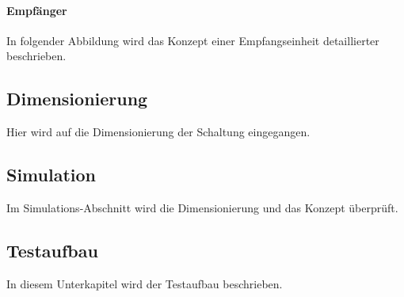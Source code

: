 \paragraph{Empfänger}
In folgender Abbildung wird das Konzept einer Empfangseinheit detaillierter beschrieben.
\subsection{Dimensionierung}
Hier wird auf die Dimensionierung der Schaltung eingegangen.
\subsection{Simulation}
Im Simulations-Abschnitt wird die Dimensionierung und das Konzept überprüft.
\subsection{Testaufbau}
In diesem Unterkapitel wird der Testaufbau beschrieben.
